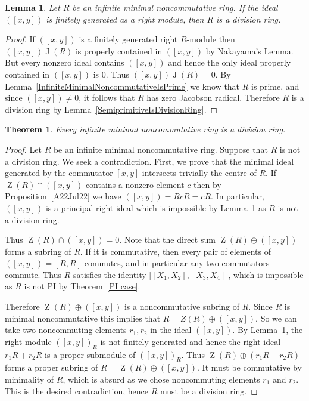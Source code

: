 \documentclass[11pt]{article}
\DeclareMathOperator{\Z}{Z}
\DeclareMathOperator{\J}{J}
\newtheorem{lemma}[corollary]{Lemma}
\newtheorem{theorem}[corollary]{Theorem}
\theoremstyle{definition}
\begin{document}
\begin{lemma}\label{MinimalIdealFinGenThenDivisionRing}
Let $R$ be an infinite minimal noncommutative ring. If the ideal $([x,y])$ is finitely generated as a right module, then $R$ is a division ring.
\end{lemma}

\begin{proof}
If $([x,y])$ is a finitely generated right $R$-module then $([x,y])\J(R)$ is properly contained in $([x,y])$ by Nakayama's Lemma. But every nonzero ideal contains $([x,y])$ and hence the only ideal properly contained in $([x,y])$ is $0$. Thus $([x,y])\J(R)=0$. By Lemma~\ref{InfiniteMinimalNoncommutativeIsPrime} we know that $R$ is prime, and since $([x,y])\neq 0$, it follows that $R$ has zero Jacobson radical. Therefore $R$ is a division ring by Lemma~\ref{SemiprimitiveIsDivisionRing}.
\end{proof}

\begin{theorem}\label{C22July22}
Every infinite minimal noncommutative ring is a division ring.
\end{theorem}

\begin{proof}
Let $R$ be an infinite minimal noncommutative ring. Suppose that $R$ is not a division ring. We seek a contradiction. First, we prove that the minimal ideal generated by the commutator $[x,y]$ intersects trivially the centre of $R$. If $\Z(R)\cap ([x,y])$ contains a nonzero element $c$ then by Proposition~\ref{A22Jul22} we have $([x,y])=RcR=cR$. In particular, $([x,y])$ is a principal right ideal which is impossible by Lemma~\ref{MinimalIdealFinGenThenDivisionRing} as $R$ is not a division ring.

Thus $\Z(R)\cap([x,y])=0$. Note that the direct sum $\Z(R)\oplus ([x,y])$ forms a subring of $R$. If it is commutative, then every pair of elements of $([x,y])=[R,R]$ commutes, and in particular any two commutators commute. Thus $R$ satisfies the identity $\big[[X_1,X_2],[X_3,X_4]\big]$, which is impossible as $R$ is not PI by Theorem~\ref{PI case}.

Therefore $\Z(R)\oplus ([x,y])$ is a noncommutative subring of $R$. Since $R$ is minimal noncommutative this implies that $R=Z(R)\oplus ([x,y])$. So we can take two noncommuting elements $r_1,r_2$ in the ideal $([x,y])$. By Lemma~\ref{MinimalIdealFinGenThenDivisionRing}, the right module $([x,y])_R$ is not finitely generated and hence the right ideal $r_1R+r_2R$ is a proper submodule of $([x,y])_R$. Thus $\Z(R)\oplus \left(r_1R+r_2R\right)$ forms a proper subring of $R=\Z(R)\oplus ([x,y])$. It must be commutative by minimality of $R$, which is absurd as we chose noncommuting elements $r_1$ and $r_2$. This is the desired contradiction, hence $R$ must be a division ring.
\end{proof}
\end{document}
